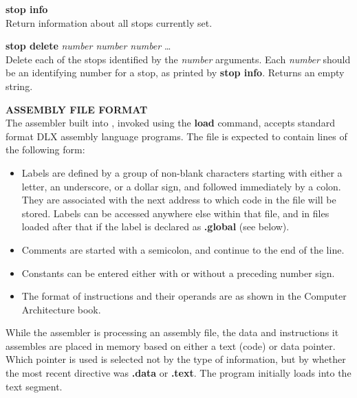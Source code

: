 \begin{mylist}
\begin{mylist}
\begin{mylist}
\item[{\bf stop info}]
\nopagebreak \hfill \\
Return information about all stops currently set.

\item[{\bf stop delete} {\em number number number} \ldots]
\nopagebreak \hfill \\
Delete each of the stops identified by the {\em number} arguments.
Each {\em number} should be an identifying number for a stop, as
printed by {\bf stop info}.  Returns an empty string.

\end{mylist}

\end{mylist}

\item[{\bf ASSEMBLY FILE FORMAT}]
\nopagebreak \hfill \\
The assembler built into \dlxsim, invoked using the {\bf load}
command, accepts standard format DLX assembly language programs.  The file is expected to contain lines of the following form:

\begin{itemize}
\item Labels are defined by a group of non-blank characters starting
with either a letter, an underscore, or a dollar sign, and followed
immediately by a colon.  They are associated with the next address to
which code in the file will be stored.  Labels can be accessed anywhere
else within that file, and in files loaded after that if the label is
declared as {\bf .global} (see below).

\item Comments are started with a semicolon, and continue to the end of the line.

\item Constants can be entered either with or without a preceding number sign.

\item The format of instructions and their operands are as shown in
the Computer Architecture book.
\end{itemize}

While the assembler is processing an assembly file, the data and
instructions it assembles are placed in memory based on either a text
(code) or data pointer.  Which pointer is used is selected not by the
type of information, but by whether the most recent directive was {\bf
.data} or {\bf .text}.  The program initially loads into the text
segment.


\end{mylist}
